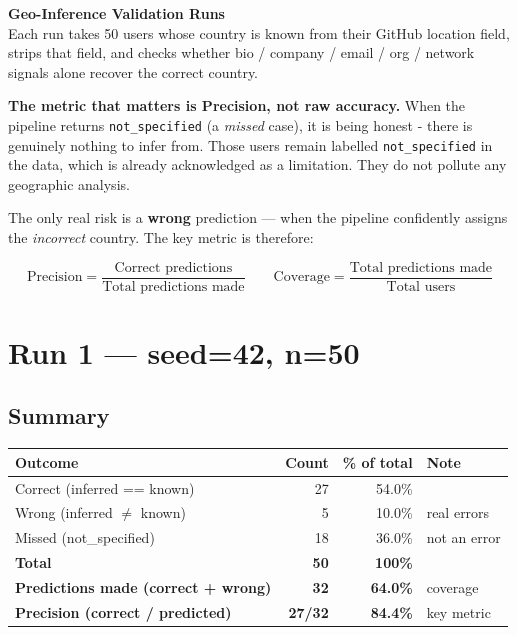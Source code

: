 \documentclass[11pt,a4paper]{article}
\begin{document}
\begin{center}
  {\Large\bfseries Geo-Inference Validation Runs}\\[6pt]
  {\small\color{gray} Each run takes 50 users whose country is known from their GitHub location field,
  strips that field, and checks whether bio / company / email / org / network signals alone
  recover the correct country.}
\end{center}

\vspace{8pt}

\noindent\textbf{The metric that matters is Precision, not raw accuracy.}
When the pipeline returns \texttt{not\_specified} (a \emph{missed} case), it is being
honest - there is genuinely nothing to infer from. Those users remain labelled
\texttt{not\_specified} in the data, which is already acknowledged as a limitation.
They do not pollute any geographic analysis.

The only real risk is a \textbf{wrong} prediction --- when the pipeline confidently
assigns the \emph{incorrect} country. The key metric is therefore:

\[
  \text{Precision} = \frac{\text{Correct predictions}}{\text{Total predictions made}} \qquad
  \text{Coverage} = \frac{\text{Total predictions made}}{\text{Total users}}
\]



\vspace{10pt}

\section{Run 1 — seed=42, n=50}

\subsection*{Summary}

\begin{tabular}{lrrl}
\toprule
\textbf{Outcome} & \textbf{Count} & \textbf{\% of total} & \textbf{Note} \\
\midrule
Correct (inferred == known) & 27 & 54.0\% & \\
Wrong   (inferred $\neq$ known) &  5 & 10.0\% & real errors \\
Missed  (not\_specified)    & 18 & 36.0\% & not an error \\
\midrule
\textbf{Total} & \textbf{50} & \textbf{100\%} & \\
\midrule
\textbf{Predictions made (correct + wrong)} & \textbf{32} & \textbf{64.0\%} & coverage \\
\textbf{Precision (correct / predicted)}    & \textbf{27/32} & \textbf{84.4\%} & key metric \\
\bottomrule
\end{tabular}
\end{document}
